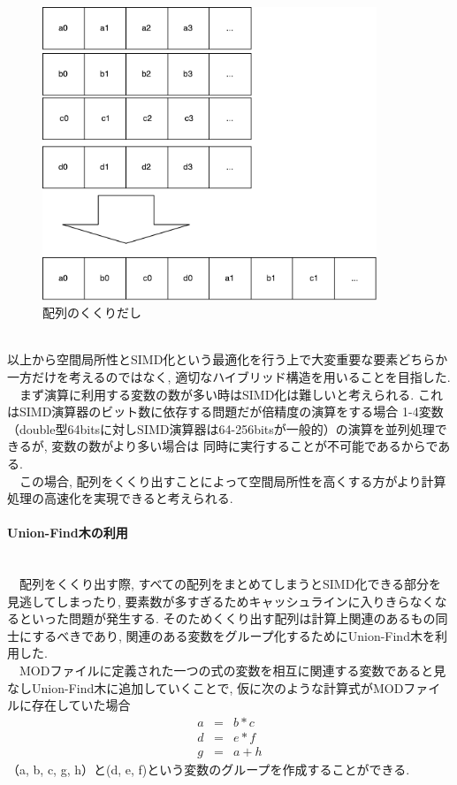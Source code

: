 \begin{figure}[htb]
  \begin{center}
    \includegraphics[width=10cm]{./images/MERGE-ARRAY.pdf}
    \caption{配列のくくりだし}
    \label{fig:merge-array}
  \end{center}
\end{figure}~\\
以上から空間局所性とSIMD化という最適化を行う上で大変重要な要素どちらか一方だけを考えるのではなく,
適切なハイブリッド構造を用いることを目指した.\\
　まず演算に利用する変数の数が多い時はSIMD化は難しいと考えられる. これはSIMD演算器のビット数に依存する問題だが倍精度の演算をする場合
1-4変数（double型64bitsに対しSIMD演算器は64-256bitsが一般的）の演算を並列処理できるが, 変数の数がより多い場合は
同時に実行することが不可能であるからである.\\
　この場合, 配列をくくり出すことによって空間局所性を高くする方がより計算処理の高速化を実現できると考えられる.\\

\paragraph{Union-Find木の利用}~\\
　配列をくくり出す際, すべての配列をまとめてしまうとSIMD化できる部分を見逃してしまったり,
要素数が多すぎるためキャッシュラインに入りきらなくなるといった問題が発生する.
そのためくくり出す配列は計算上関連のあるもの同士にするべきであり, 関連のある変数をグループ化するためにUnion-Find木を利用した.\\
　MODファイルに定義された一つの式の変数を相互に関連する変数であると見なしUnion-Find木に追加していくことで, 仮に次のような計算式がMODファイルに存在していた場合
\begin{eqnarray}
  a &=& b * c\\
  d &=& e * f\\
  g &=& a + h
\label{eq:3x0}
\end{eqnarray}
（a, b, c, g, h）と(d, e, f)という変数のグループを作成することができる.\\


